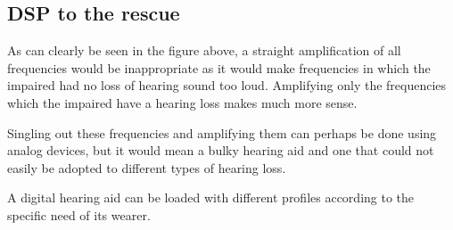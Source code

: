 \documentclass[a4wide,10pt]{article}
\begin{document}
\subsection{DSP to the rescue} %
\label{sub:dsp_to_the_rescue}
As can clearly be seen in the figure above, a straight amplification of all frequencies would be inappropriate as it would make frequencies in which the impaired had no loss of hearing sound too loud. Amplifying only the frequencies which the impaired have a hearing loss makes much more sense.

Singling out these frequencies and amplifying them can perhaps be done using analog devices, but it would mean a bulky hearing aid and one that could not easily be adopted to different types of hearing loss.

A digital hearing aid can be loaded with different profiles according to the specific need of its wearer.
\end{document}
